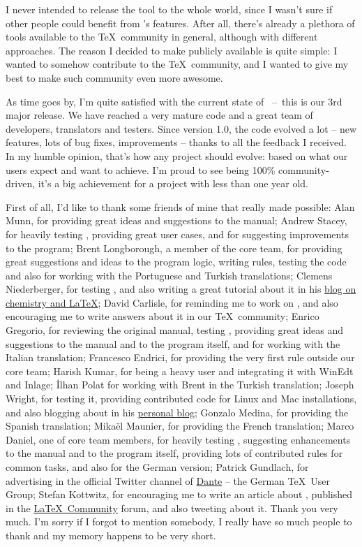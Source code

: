 \documentclass[a4paper,twoside,12pt]{memoir}
\begin{document}
I never intended to release the tool to the whole world, since I wasn't sure if other people could benefit from \arara's features. After all, there's already a plethora of tools available to the \TeX\ community in general, although with different approaches. The reason I decided to make \arara publicly available is quite simple: I wanted to somehow contribute to the \TeX\ community, and I wanted to give my best to make such community even more awesome.

As time goes by, I'm quite satisfied with the current state of \arara~--~this is our 3rd major release. We have reached a very mature code and a great team of developers, translators and testers. Since version 1.0, the code evolved a lot -- new features, lots of bug fixes, improvements -- thanks to all the feedback I received. In my humble opinion, that's how any project should evolve: based on what our users expect and want to achieve. I'm proud to see \arara being 100\% community-driven, it's a big achievement for a project with less than one year old.

First of all, I'd like to thank some friends of mine that really made \arara possible: Alan Munn, for providing great ideas and suggestions to the manual; Andrew Stacey, for heavily testing \arara, providing great user cases, and for suggesting improvements to the program; Brent Longborough, a member of the core team, for providing great suggestions and ideas to the program logic, writing rules, testing the code and also for working with the Portuguese and Turkish translations; Clemens Niederberger, for testing \arara, and also writing a great tutorial about it in his \href{http://www.mychemistry.eu/2012/06/arara-automate-latex-birds-music/}{blog on chemistry and \LaTeX}; David Carlisle, for reminding me to work on \arara, and also encouraging me to write answers about it in our \TeX\ community; Enrico Gregorio, for reviewing the original manual, testing \arara, providing great ideas and suggestions to the manual and to the program itself, and for working with the Italian translation; Francesco Endrici, for providing the very first \arara rule outside our core team; Harish Kumar, for being a heavy \arara user and integrating it with WinEdt and Inlage; \.Ilhan Polat for working with Brent in the Turkish translation; Joseph Wright, for testing it, providing contributed code for Linux and Mac installations, and also blogging about \arara in his 
     \href{http://www.texdev.net}{personal blog}; Gonzalo Medina, for providing the Spanish translation; Mikaël Maunier, for providing the French translation; Marco Daniel, one of core team members, for heavily testing \arara, suggesting enhancements to the manual and to the program itself, providing lots of contributed rules for common tasks, and also for the German version; Patrick Gundlach, for advertising \arara in the official Twitter channel of \href{http://www.dante.de}{Dante} -- the German \TeX\ User Group; Stefan Kottwitz, for encouraging me to write an article about \arara, published in the \href{http://latex-community.org/know-how/435-gnuplot-arara}{\LaTeX\ Community} forum, and also tweeting about it. Thank you very much. I'm sorry if I forgot to mention somebody, I really have so much people to thank and my memory happens to be very short.
\end{document}
